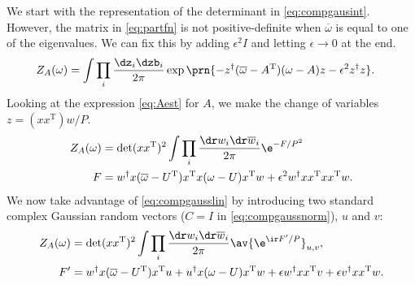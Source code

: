 \documentclass[12pt]{article}
\newcommand{\inv}{^{-1}}
\newcommand{\dg}{^\dagger}
\newcommand{\trans}{^\mathrm{T}}
\newcommand{\omb}{\overline{\omega}}
\newcommand{\dw}{\dr w}
\newcommand{\dwb}{\dr\overline{w}}
\begin{document}
We start with the representation of the determinant in \eqref{eq:compgausint}.
However, the matrix in \eqref{eq:partfn} is not positive-definite when $\omb$ is equal to one of the eigenvalues.
We can fix this by adding $\epsilon^2I$ and letting $\epsilon\to0$ at the end.
%
\begin{equation}\label{eq:partfnintz}
\begin{aligned}
  Z_A(\omega) &= \int \prod_i\frac{\dz_i\dzb_i}{2\pi} \exp\prn{
    -z\dg (\omb-A\trans)(\omega-A) z - \epsilon^2 z\dg z} .%
\end{aligned}
\end{equation}
%
Looking at the expression \eqref{eq:Aest} for $A$, we make the change of variables $z=(xx\trans)w/P$.
%
\begin{equation}\label{eq:partfnintw}
\begin{aligned}
  Z_A(\omega) &= \det(xx\trans)^2 \int \prod_i\frac{\dw_i\dwb_i}{2\pi}\e^{-F/P^2}
    \\
  F &=
     w\dg x(\omb-U\trans)x\trans x(\omega-U)x\trans w + \epsilon^2 w\dg xx\trans xx\trans w .%
\end{aligned}
\end{equation}
%
We now take advantage of \eqref{eq:compgausslin} by introducing two standard complex Gaussian random vectors ($C=I$ in \eqref{eq:compgaussnorm}), $u$ and $v$:
%
\begin{equation}\label{eq:partfnintwuv}
\begin{aligned}
  Z_A(\omega) &= \det(xx\trans)^2 \int \prod_i\frac{\dw_i\dwb_i}{2\pi} \av{\e^{\ir F'/P}}_{u,v},\\
  F' &=
    w\dg x(\omb-U\trans)x\trans u + u\dg x(\omega-U)x\trans w + \epsilon w\dg xx\trans v + \epsilon v\dg xx\trans w .%
\end{aligned}
\end{equation}
%
\end{document}
